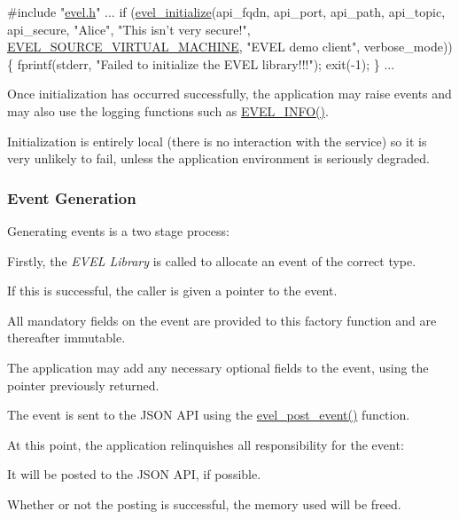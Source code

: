 \begin{DoxyCode}
\textcolor{preprocessor}{#include "\hyperlink{evel_8h}{evel.h}"}
...
if (\hyperlink{evel_8c_aff020c5505e724b414ac981e2a23fcd6}{evel\_initialize}(api\_fqdn,
                    api\_port,
                    api\_path,
                    api\_topic,
                    api\_secure,
                    \textcolor{stringliteral}{"Alice"},
                    \textcolor{stringliteral}{"This isn't very secure!"},
                    \hyperlink{evel_8h_a304eae0d024005dc4c7031bdd774d64aa4fbe43c85c55ae14048a2dc7fc5bfcc8}{EVEL\_SOURCE\_VIRTUAL\_MACHINE},
                    \textcolor{stringliteral}{"EVEL demo client"},
                    verbose\_mode))
\{
  fprintf(stderr, \textcolor{stringliteral}{"Failed to initialize the EVEL library!!!"});
  exit(-1);
\}
...
\end{DoxyCode}
 Once initialization has occurred successfully, the application may raise events and may also use the logging functions such as \hyperlink{evel_8h_a4230856762649c13d728edb6384d7e62}{E\+V\+E\+L\+\_\+\+I\+N\+F\+O()}.

Initialization is entirely local (there is no interaction with the service) so it is very unlikely to fail, unless the application environment is seriously degraded.\hypertarget{quickstart_qs_generate}{}\subsubsection{Event Generation}\label{quickstart_qs_generate}
Generating events is a two stage process\+:


\begin{DoxyEnumerate}
\item Firstly, the {\itshape E\+V\+E\+L Library} is called to allocate an event of the correct type.
\begin{DoxyItemize}
\item If this is successful, the caller is given a pointer to the event.
\item All mandatory fields on the event are provided to this factory function and are thereafter immutable.
\item The application may add any necessary optional fields to the event, using the pointer previously returned.
\end{DoxyItemize}
\item The event is sent to the J\+S\+O\+N A\+P\+I using the \hyperlink{evel_8h_a209d2e5dbffe9e11ac79ae140f4a81bd}{evel\+\_\+post\+\_\+event()} function.
\begin{DoxyItemize}
\item At this point, the application relinquishes all responsibility for the event\+:
\begin{DoxyItemize}
\item It will be posted to the J\+S\+O\+N A\+P\+I, if possible.
\item Whether or not the posting is successful, the memory used will be freed.
\end{DoxyItemize}
\end{DoxyItemize}
\end{DoxyEnumerate}

